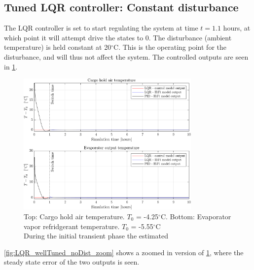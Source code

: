 \subsection{Tuned LQR controller: Constant disturbance}
The LQR controller is set to start regulating the system at time $t=1.1$ hours, at which point it will attempt drive the states to 0. The disturbance (ambient temperature) is held constant at 20$^{\circ}$C. This is the operating point for the disturbance, and will thus not affect the system. The controlled outputs are seen in \cref{fig:LQR_wellTuned_noDist}.\\


\begin{figure}[H]
	\centering
	\includegraphics[width=0.8\textwidth]{Graphics/fig_LQRvsKresten_noDist.png}
	\caption{Top: Cargo hold air temperature. $T_0$ = -4.25$^{\circ}$C. Bottom: Evaporator vapor refridgerant temperature. $T_0$ = -5.55$^{\circ}$C\\\hspace{\textwidth} During the initial transient phase the estimated }
	\label{fig:LQR_wellTuned_noDist}
\end{figure}

\cref{fig:LQR_wellTuned_noDist_zoom} shows a zoomed in version of \cref{fig:LQR_wellTuned_noDist}, where the steady state error of the two outputs is seen.\\


